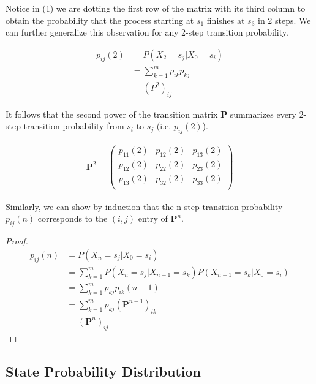 \documentclass[a4paper, 12pt]{article}
\begin{document}
	Notice in (1) we are dotting the first row of the matrix  with its third column to obtain the probability 
	that the process starting at $s_1$ finishes at $s_3$ in 2 steps. We can further generalize this observation for any 2-step 
	transition probability.

	\begin{equation*}
		\begin{aligned}
			p_{ij}(2) &= P(X_2 = s_j|X_0 = s_i) \\ 
					&= \sum_{k=1}^{m} p_{ik}p_{kj}\\
					&= (P^2)_{ij}
		\end{aligned}
	\end{equation*}	    

	It follows that the second power of the transition matrix \textbf{P} summarizes every 2-step transition probability 
	from $s_i$ to $s_j$ (i.e. $p_{ij}(2)$).

	\begin{equation*}
		\begin{aligned}
			\mathbf{P}^2 =
			\begin{pmatrix}
				p_{11}(2) & p_{12}(2) & p_{13}(2) \\
				p_{12}(2) & p_{22}(2) & p_{23}(2) \\
				p_{13}(2) & p_{32}(2) & p_{33}(2) \\
			\end{pmatrix}
		\end{aligned}
	\end{equation*}

	Similarly, we can show by induction that the n-step transition probability $p_{ij}(n)$ corresponds to the $(i,j)$ entry 
	of $\mathbf{P}^n$. 
	\begin{proof}
	\begin{equation*}
		\begin{aligned}
			p_{ij}(n) &= P(X_n = s_j|X_0 = s_i) \\
					&= \sum_{k=1}^{m} P(X_n = s_j|X_{n-1} = s_k)P(X_{n-1} = s_k | X_0 = s_i) \\
					&= \sum_{k=1}^{m} p_{kj}p_{ik}(n-1) \\
					&= \sum_{k=1}^{m} p_{kj}(\mathbf{P}^{n-1})_{ik} \\
					&= (\mathbf{P}^n)_{ij} 
		\end{aligned}
	\end{equation*}	
	\end{proof}
	
\subsection*{State Probability Distribution}
\end{document}
